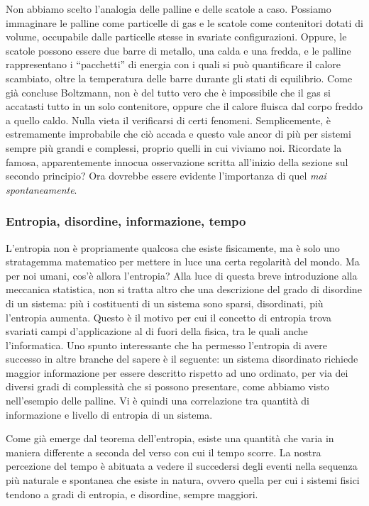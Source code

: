 Non abbiamo scelto l'analogia delle palline e delle scatole a caso.
Possiamo immaginare le palline come particelle di gas e le scatole
come contenitori dotati di volume, occupabile dalle particelle stesse
in svariate configurazioni. Oppure, le scatole possono essere
due barre di metallo, una calda e una fredda, e le palline
rappresentano i ``pacchetti'' di energia con i quali si può
quantificare il calore scambiato, oltre la temperatura delle barre durante
gli stati di equilibrio. Come già concluse Boltzmann, non è
del tutto vero che è impossibile che il gas si accatasti
tutto in un solo contenitore, oppure che il calore fluisca
dal corpo freddo a quello caldo. Nulla vieta il verificarsi di
certi fenomeni. Semplicemente, è estremamente
improbabile che ciò accada e questo vale ancor di più per sistemi
sempre più grandi e complessi, proprio quelli in cui viviamo noi.
Ricordate la famosa, apparentemente innocua osservazione scritta
all'inizio della sezione sul secondo principio? Ora dovrebbe essere
evidente l'importanza di quel \emph{mai spontaneamente}.

\subsubsection*{Entropia, disordine, informazione, tempo}
L'entropia non è propriamente qualcosa che esiste fisicamente,
ma è solo uno stratagemma matematico per mettere in luce una
certa regolarità del mondo.
Ma per noi umani, cos'è allora l'entropia? Alla luce di questa breve introduzione
alla meccanica statistica, non si tratta altro che una descrizione
del grado di disordine di un sistema: più i costituenti di un
sistema sono sparsi, disordinati, più l'entropia aumenta. Questo
è il motivo per cui il concetto di entropia trova svariati campi
d'applicazione al di fuori della fisica, tra le quali anche
l'informatica. Uno spunto interessante che ha permesso l'entropia
di avere successo in altre branche del sapere è il seguente: un
sistema disordinato richiede maggior informazione per essere
descritto rispetto ad uno ordinato, per via dei diversi gradi
di complessità che si possono presentare, come abbiamo visto
nell'esempio delle palline. Vi è quindi una correlazione tra
quantità di informazione e livello di entropia di un sistema.

Come già emerge dal teorema dell'entropia, esiste una quantità
che varia in maniera differente a seconda del verso con cui il
tempo scorre. La nostra percezione del tempo è abituata a vedere
il succedersi degli eventi nella sequenza più naturale e spontanea
che esiste in natura, ovvero quella per cui i sistemi fisici tendono
a gradi di entropia, e disordine, sempre maggiori.

